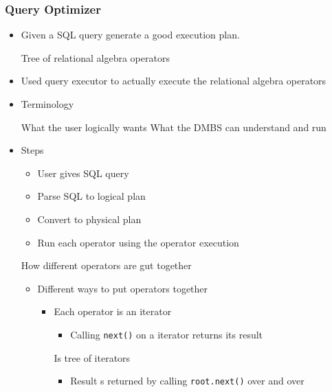 \subsubsection{Query Optimizer}
\begin{itemize}
    \item Given a SQL query generate a good execution plan.
        \begin{itemize}
             Tree of relational algebra operators
        \end{itemize}
    \item Used query executor to actually execute the relational algebra operators
    \item Terminology
        \begin{itemize}
             What the user logically wants
             What the DMBS can understand and run
        \end{itemize}
    \item Steps
        \begin{itemize}
            \item User gives SQL query
            \item Parse SQL to logical plan
            \item Convert to physical plan
            \item Run each operator using the operator execution
        \end{itemize}
     How different operators are gut together
        \begin{itemize}
            \item Different ways to put operators together
                \begin{itemize}
                    \item Each operator is an iterator
                        \begin{itemize}
                             Set of streams of tuples
                             Stream of tuples
                            \item Calling \verb+next()+ on a iterator returns its result
                        \end{itemize}
                     Is tree of iterators
                        \begin{itemize}
                            \item Result s returned by calling \verb+root.next()+ over and over

\end{itemize}
\end{itemize}
\end{itemize}
\end{itemize}
